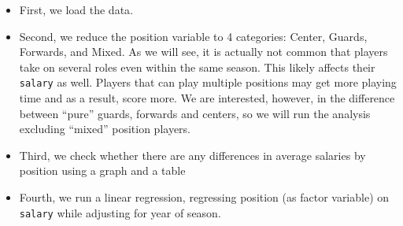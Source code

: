 \documentclass[
]{book}
\providecommand{\tightlist}{%
  \setlength{\itemsep}{0pt}\setlength{\parskip}{0pt}}
\begin{document}
\begin{itemize}
\tightlist
\item
  First, we load the data.
\item
  Second, we reduce the position variable to 4 categories: Center, Guards, Forwards, and Mixed. As we will see, it is actually not common that players take on several roles even within the same season. This likely affects their \texttt{salary} as well. Players that can play multiple positions may get more playing time and as a result, score more. We are interested, however, in the difference between ``pure'' guards, forwards and centers, so we will run the analysis excluding ``mixed'' position players.
\item
  Third, we check whether there are any differences in average salaries by position using a graph and a table
\item
  Fourth, we run a linear regression, regressing position (as factor variable) on \texttt{salary} while adjusting for year of season.
\end{itemize}
\end{document}
